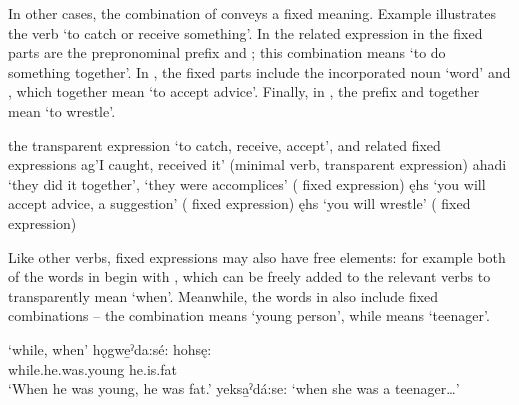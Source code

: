 In other cases, the combination of  conveys a fixed meaning. Example  illustrates the verb  ‘to catch or receive something’. In the related expression in  the fixed parts are the  \textsc{\dualic} prepronominal prefix and ; this combination means ‘to do something together’. In , the fixed parts include the incorporated noun  ‘word’ and , which together mean ‘to accept advice’. Finally, in , the  \textsc{} prefix and  together mean ‘to wrestle’.

\ea\label{ex:verbex29} the transparent expression  ‘to catch, receive, accept’, and related fixed expressions
\ea\label{ex:verbex29a} ag’I caught, received it’ (minimal verb,  transparent expression)
\ex\label{ex:verbex29b} ahadi ‘they did it together’, ‘they were accomplices’ ( fixed expression)
\ex\label{ex:verbex29c} ęhs ‘you will accept advice, a suggestion’ ( fixed expression)
\ex\label{ex:verbex29d} ęhs ‘you will wrestle’ ( fixed expression)
\z
\z

Like other verbs, fixed expressions may also have free elements: for example both of the words in  begin with  \textsc{\coincident}, which can be freely added to the relevant verbs to transparently mean ‘when’. Meanwhile, the words in  also include fixed  combinations -- the combination   means ‘young person’, while   means ‘teenager’.

\ea\label{ex:tsiex}  ‘while, when’
\ea\label{ex:tsiexa} 
 \gll {}hǫgwe̱ˀda:sé: hohsę: \\
while.he.was.young he.is.fat\\
\glt ‘When he was young, he was fat.’ 
\ex {}yeksa̱ˀdá:se: ‘when she was a teenager…’ \label{ex:tsiexb}
\z
\z


